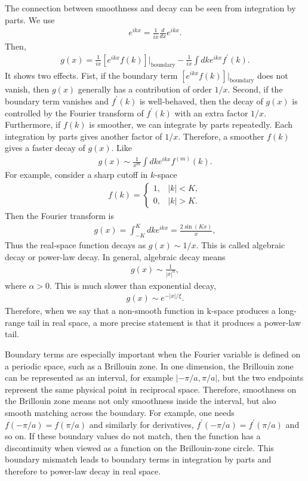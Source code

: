 \documentclass[12pt, oneside]{article}
\newcommand{\mr}[1]{\mathrm{#1}}
\newcommand{\p}[1]{\left(#1\right)}
\newcommand{\bb}[1]{\left[#1\right]}
\newcommand{\bv}[1]{\left|#1\right|}
\numberwithin{equation}{subsection}
\begin{document}
The connection between smoothness and decay can be seen from integration by parts. We use 
\begin{align}
	e^{i k x } = \frac{1}{i x} \frac{d}{dx} e^{i k x}.
\end{align}
Then, 
\begin{align}
	g\p{x} = \frac{1}{i x} \bb{e^{i k x} f \p{k}} \bigg|_{\mr{boundary}} - \frac{1}{i x} \int dk e^{i k x} f^{\prime} \p{k}.  
\end{align}
It shows two effects. Fist, if the boundary term \(\bb{e^{i k x} f \p{k}} \bigg|_{\mr{boundary}}\) does not vanish, then \(g \p{x}\) generally has a contribution of order \(1/x\). Second, if the boundary term vanishes and \(f^{\prime} \p{k}\) is well-behaved, then the decay of \(g \p{x}\) is controlled by the Fourier transform of \( f^{\prime} \p{k}\) with an extra factor \(1/x\). Furthermore, if \(f \p{k}\) is smoother, we can integrate by parts repeatedly. Each integration by parts gives another factor of \(1/x\). Therefore, a smoother \(f \p{k}\) gives a faster decay of \(g \p{x}\). Like 
\begin{align}
	g\p{x} \sim \frac{1}{x^m} \int dk e^{i kx} f^{\p{m}} \p{k}.
\end{align}
For example, consider a sharp cutoff in \(k\)-space
\begin{align}
	f(k)= \begin{cases} 
		1, & |k|<K,\\
		0, & |k|>K.
	\end{cases}
\end{align}
Then the Fourier transform is 
\begin{align}
	g\p{x} = \int_{-K}^{K} dk e^{i k x} = \frac{2 \sin\p{Kx}}{x},
\end{align}
Thus the real-space function decays as \(g \p{x} \sim 1/x\). This is called algebraic decay or power-law decay. In general, algebraic decay means
\begin{align}
	g\p{x} \sim \frac{1}{\bv{x}^{\alpha}},
\end{align}
where \(\alpha > 0 \). This is much slower than exponential decay,
\begin{align}
	g \p{x} \sim e^{- \bv{x}/\xi}.
\end{align}
Therefore, when we say that a non-smooth function in k-space produces a long-range tail in real space, a more precise statement is that it produces a power-law tail.

Boundary terms are especially important when the Fourier variable is defined on a periodic space, such as a Brillouin zone. In one dimension, the Brillouin zone can be represented as an interval, for example \(\bv{-\pi/a, \pi/a}\), but the two endpoints represent the same physical point in reciprocal space. Therefore, smoothness on the Brillouin zone means not only smoothness inside the interval, but also smooth matching across the boundary. For example, one needs \(f \p{-\pi/a} = f\p{\pi/a}\) and similarly for derivatives, \(f^{\prime} \p{-\pi/a} = f^{\prime} \p{\pi/a}\) and so on. If these boundary values do not match, then the function has a discontinuity when viewed as a function on the Brillouin-zone circle. This boundary mismatch leads to boundary terms in integration by parts and therefore to power-law decay in real space.
\end{document}
